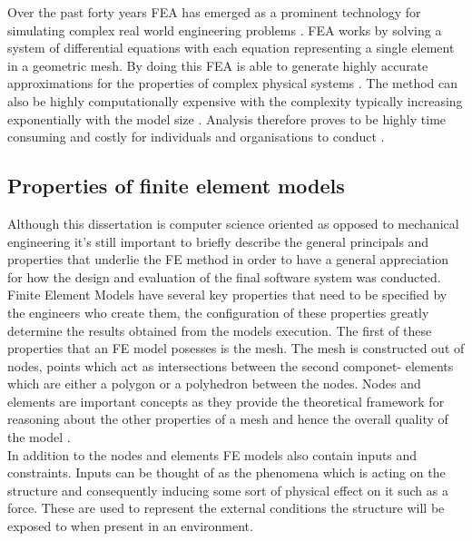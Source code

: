 \documentclass{article}
\begin{document}
Over the past forty years FEA has emerged as a prominent technology for simulating complex real world engineering problems \cite{cite0, DolsakPaper94}. FEA works by solving a system of differential equations with each equation representing a single element in a geometric mesh. By doing this FEA is able to generate highly accurate approximations for the properties of complex physical systems \cite{DolsakPaper94} \cite{IntroductionToFE}. The method can also be highly computationally expensive with the complexity typically increasing exponentially with the model size \cite{DolsakPaper94}. Analysis therefore proves to be highly time consuming and costly for individuals and organisations to conduct \cite{ConsultRuleIntelltSystemFE}. \cite{cite03}\\


\subsection{Properties of finite element models}
Although this dissertation is computer science oriented as opposed to mechanical engineering it's still important to briefly describe the general principals and properties that underlie the FE method in order to have a general appreciation for how the design and evaluation of the final software system was conducted. \\ 

\noindent
Finite Element Models have several key properties that need to be specified by the engineers who create them, the configuration of these properties greatly determine the results obtained from the models execution. The first of these properties that an FE model posesses is the mesh. The mesh is constructed out of nodes, points which act as intersections between the second componet- elements which are either a polygon or a polyhedron between the nodes. Nodes and elements are important concepts as they provide the theoretical framework for reasoning about the other properties of a mesh and hence the overall quality of the model \cite{IntroductionToFE}.\\ 

\noindent
In addition to the nodes and elements FE models also contain inputs and constraints. Inputs can be thought of as the phenomena which is acting on the structure and consequently inducing some sort of physical effect on it such as a force. These are used to represent the external conditions the structure will be exposed to when present in an environment. \\
\end{document}
